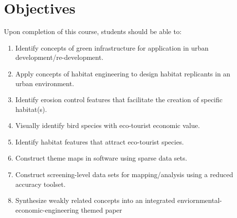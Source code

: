 \documentclass[12pt]{article}
\begin{document}
\section*{Objectives}
Upon completion of this course, students should be able to:
\begin{enumerate}
\item Identify concepts of green infrastructure for application in urban development/re-development.
\item Apply concepts of habitat engineering to design habitat replicants in an urban environment.
\item Identify erosion control features that facilitate the creation of specific habitat(s).
\item Visually identify bird species with eco-tourist economic value.
\item Identify habitat features that attract eco-tourist species.
\item Construct theme maps in software using sparse data sets.
\item Construct screening-level data sets for mapping/analysis using a reduced accuracy toolset.
\item Synthesize weakly related concepts into an integrated enviornmental-economic-engineering themed paper
\end{enumerate}
\clearpage
\end{document}
